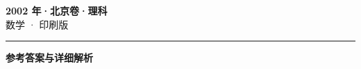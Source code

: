 \documentclass[zihao=5, a4paper]{ctexart}
\begin{document}
\begin{center}
  {\Large\bfseries 2002 年·北京卷·理科}\\[4pt]
  {\large 数学 · 印刷版}
\end{center}
\medskip
{}

\par\bigskip\hrule\bigskip
{}
\begin{center}{\large\bfseries 参考答案与详细解析}\end{center}
\smallskip

\end{document}
